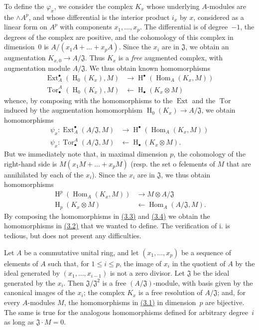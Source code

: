 \documentclass{article}
\theoremstyle{plain}
\newenvironment{proposition}[1]
  {\renewcommand\theinnerproposition{#1}\innerproposition}
  {\endinnerproposition}
\theoremstyle{definition}
\newcommand{\from}{\leftarrow}
\renewcommand{\leq}{\leqslant}
\DeclareMathOperator{\Ext}{Ext}
\DeclareMathOperator{\Hom}{Hom}
\DeclareMathOperator{\Tor}{Tor}
\DeclareMathOperator{\HH}{H}
\newcommand{\oldpage}[1]{\marginpar{\footnotesize$\Big\vert$ \textit{p.~#1}}}
\begin{document}
To define the $\varphi_x$, we consider the complex $K_x$ whose underlying $A$-modules are the $\wedge A^p$, and whose differential is the interior product $i_x$ by $x$, considered as a linear form on $A^p$ with components $x_1,\ldots,x_p$.
The differential is of degree~$-1$, the degrees of the complex are positive, and the cohomology of this complex in dimension~$0$ is $A/(x_1A+\ldots+x_pA)$.
Since the $x_i$ are in $\mathfrak{J}$, we obtain an augmentation $K_{x,0}\to A/\mathfrak{J}$.
Thus $K_x$ is a \emph{free} augmented complex, with augmentation module $A/\mathfrak{J}$.
We thus obtain known homomorphisms
\[
  \begin{aligned}
    \Ext_A^\bullet(\HH_0(K_x),M) &\to \HH^\bullet(\Hom_A(K_x,M))
  \\\Tor_\bullet^A(\HH_0(K_x),M) &\from \HH_\bullet(K_x\otimes M)
  \end{aligned}
\]
whence, by composing with the homomorphisms to the $\Ext$ and the $\Tor$ induced by the augmentation homomorphism $\HH_0(K_x)\to A/\mathfrak{J}$, we obtain homomorphisms
\[
\label{3.3}
  \begin{aligned}
    \psi_x\colon \Ext_A^\bullet(A/\mathfrak{J},M) &\to \HH^\bullet(\Hom_A(K_x,M))
  \\\psi_x\colon \Tor_\bullet^A(A/\mathfrak{J},M) &\from \HH_\bullet(K_x\otimes M).
  \end{aligned}
\tag{3.3}
\]
But we immediately note that, in maximal dimension $p$, the cohomology of the right-hand side is $M(x_1M+\ldots+x_pM)$ (resp. the set o felements of $M$ that are annihilated by each of the $x_i$).
Since the $x_i$ are in $\mathfrak{J}$, we thus obtain homomorphisms
\[
\label{3.4}
  \begin{aligned}
    \HH^p(\Hom_A(K_x,M)) &\to M\otimes A/\mathfrak{J}
  \\\HH_p(K_x\otimes M) &\from \Hom_A(A/\mathfrak{J},M).
  \end{aligned}
\tag{3.4}
\]
By composing the homomorphisms in \hyperref[3.3]{(3.3)} and \hyperref[3.4]{(3.4)} we obtain the homomorphisms in \hyperref[3.2]{(3.2)} that we wanted to define.
The verification of i. is tedious, but does not present any difficulties.

\oldpage{149-07}
\begin{proposition}{4}
\label{proposition4}
  Let $A$ be a commutative unital ring, and let $(x_1,\ldots,x_p)$  be a sequence of elements of $A$ such that, for $1\leq i\leq p$, the image of $x_i$ in the quotient of $A$ by the ideal generated by $(x_1,\ldots,x_{i-1})$ is not a zero divisor.
  Let $\mathfrak{J}$ be the ideal generated by the $x_i$.
  Then $\mathfrak{J}/\mathfrak{J}^2$ is a free $(A/\mathfrak{J})$-module, with basis given by the canonical images of the $x_i$;
  the complex $K_x$ is a free resolution of $A/\mathfrak{J}$;
  and, for every $A$-modules $M$, the homomorphisms in \hyperref[3.1]{(3.1)} in dimension~$p$ are bijective.
  The same is true for the analogous homomorphisms defined for arbitrary degree~$i$ as long as $\mathfrak{J}\cdot M=0$.
\end{proposition}
\end{document}
